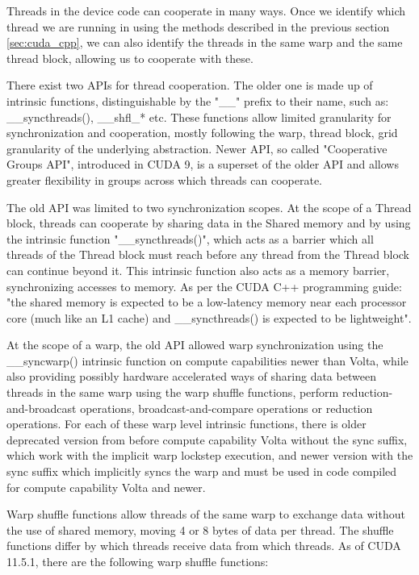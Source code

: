 Threads in the device code can cooperate in many ways. Once we identify which thread we are running in using the methods described in the previous section \ref{sec:cuda_cpp}, we can also identify the threads in the same warp and the same thread block, allowing us to cooperate with these.

There exist two APIs for thread cooperation. The older one is made up of intrinsic functions, distinguishable by the "\_\_" prefix to their name, such as: \_\_syncthreads(), \_\_shfl\_* etc.
These functions allow limited granularity for synchronization and cooperation, mostly following the warp, thread block, grid granularity of the underlying abstraction. Newer API, so called "Cooperative Groups API", introduced in CUDA 9, is a superset of the older API and allows greater flexibility in groups across which threads can cooperate. 

The old API was limited to two synchronization scopes. At the scope of a Thread block, threads can cooperate by sharing data in the Shared memory and by using the intrinsic function "\_\_syncthreads()", which acts as a barrier which all threads of the Thread block must reach before any thread from the Thread block can continue beyond it. This intrinsic function also acts as a memory barrier, synchronizing accesses to memory. As per the CUDA C++ programming guide: %
"the shared memory is expected to be a low-latency memory near each processor core (much like an L1 cache) and \_\_syncthreads() is expected to be lightweight".

At the scope of a warp, the old API allowed warp synchronization using the \_\_syncwarp() intrinsic function on compute capabilities newer than Volta, while also providing possibly hardware accelerated ways of sharing data between threads in the same warp using the warp shuffle functions, perform reduction-and-broadcast operations, broadcast-and-compare operations or reduction operations. For each of these warp level intrinsic functions, there is older deprecated version from before compute capability Volta without the sync suffix, which work with the implicit warp lockstep execution, and newer version with the sync suffix which implicitly syncs the warp and must be used in code compiled for compute capability Volta and newer.

Warp shuffle functions allow threads of the same warp to exchange data without the use of shared memory, moving 4 or 8 bytes of data per thread. The shuffle functions differ by which threads receive data from which threads. As of CUDA 11.5.1, there are the following warp shuffle functions:

